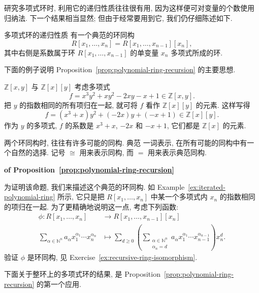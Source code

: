研究多项式环时, 利用它的递归性质往往很有用, 因为这样便可对变量的个数使用归纳法. 下一个结果相当显然; 但由于经常要用到它, 我们仍仔细陈述如下.

\begin{Proposition}{多项式环的递归性质}\label{prop:polynomial-ring-recursion}
  有一个典范的环同构
  \[
    R[x_{1},\ldots,x_{n}]=R[x_{1},\ldots,x_{n-1}][x_{n}],
  \]
  其中右侧是系数属于环 $R[x_{1},\ldots,x_{n-1}]$ 的单变量 $x_{n}$ 多项式所成的环.
\end{Proposition}

下面的例子说明 Proposition~\ref{prop:polynomial-ring-recursion} 的主要思想.

\begin{Example}{{\textmd{$\mathbb{Z}[x,y]$} 与 \textmd{$\mathbb{Z}[x][y]$}}}\label{ex:iterated-polynomial-ring}
  考虑多项式
  \[
    f=x^{3}y^{2}+xy^{2}-2xy-x+1\in\mathbb{Z}[x,y].
  \]
  把 $y$ 的指数相同的所有项归在一起, 就可将 $f$ 看作 $\mathbb{Z}[x][y]$ 的元素. 这样写得
  \[
    f=(x^{3}+x)y^{2}+(-2x)y+(-x+1)\in\mathbb{Z}[x][y].
  \]
  作为 $y$ 的多项式, $f$ 的系数是 $x^{3}+x$, $-2x$ 和 $-x+1$, 它们都是 $\mathbb{Z}[x]$ 的元素.
\end{Example}

\begin{BookFlowNote}{%
  两个环同构时, 往往有许多可能的同构. \textquotedbl{}典范\textquotedbl{} 一词表示, 在所有可能的同构中有一个自然的选择.
  记号 $\cong$ 用来表示同构, 而 $=$ 用来表示典范同构.
}
\begin{Proof}\unskip\textbf{ of Proposition~\ref{prop:polynomial-ring-recursion}}\par\noindent
  为证明该命题, 我们来描述这个典范的环同构. 如 Example~\ref{ex:iterated-polynomial-ring} 所示, 它只是把 $R[x_{1},\ldots,x_{n}]$ 中某一个多项式内 $x_{n}$ 的指数相同的项归在一起.
  为了更精确地说明这一点, 考虑下列函数:
  \[
    \begin{aligned}
      \phi:R[x_{1},\ldots,x_{n}]&\to R[x_{1},\ldots,x_{n-1}][x_{n}]\\
      \sum_{\alpha\in\mathbb{N}^{n}}a_{\alpha}x_{1}^{\alpha_{1}}\cdots x_{n}^{\alpha_{n}}
      &\mapsto
      \sum_{d\ge0}\left(\sum_{\substack{\alpha\in\mathbb{N}^{n}\\\alpha_{n}=d}}
        a_{\alpha}x_{1}^{\alpha_{1}}\cdots x_{n-1}^{\alpha_{n-1}}\right)x_{n}^{d}.
    \end{aligned}
  \]
  验证 $\phi$ 是环同构, 见 Exercise~\ref{ex:recursive-ring-isomorphism}.
\end{Proof}
\end{BookFlowNote}

下面关于整环上的多项式环的结果, 是 Proposition~\ref{prop:polynomial-ring-recursion} 的第一个应用.
